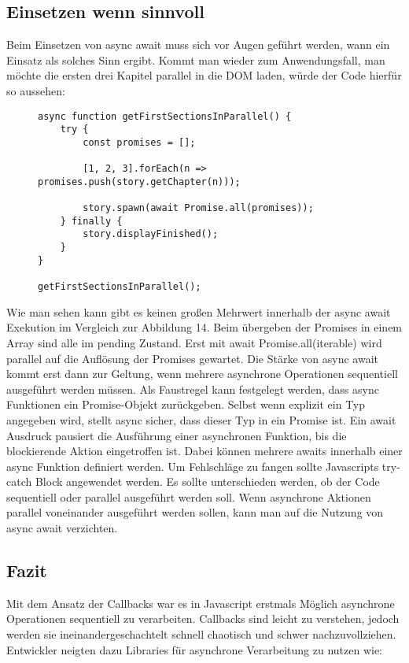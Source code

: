 \subsection{Einsetzen wenn sinnvoll}

Beim Einsetzen von async await muss sich vor Augen geführt werden, wann ein Einsatz als solches Sinn ergibt. Kommt man wieder zum Anwendungsfall, man möchte die ersten drei Kapitel parallel in die DOM laden, würde der Code hierfür so aussehen:

\begin{figure}[H]
\begin{lstlisting}[basicstyle=\small]
async function getFirstSectionsInParallel() {
    try {
        const promises = [];

        [1, 2, 3].forEach(n => promises.push(story.getChapter(n)));

        story.spawn(await Promise.all(promises));
    } finally {
        story.displayFinished();
    }
}

getFirstSectionsInParallel();
\end{lstlisting}
\end{figure}

\noindent
Wie man sehen kann gibt es keinen großen Mehrwert innerhalb der async await Exekution im Vergleich zur Abbildung 14. Beim übergeben der Promises in einem Array sind alle im pending Zustand. Erst mit await Promise.all(iterable) wird parallel auf die Auflösung der Promises gewartet. Die Stärke von async await kommt erst dann zur Geltung, wenn mehrere asynchrone Operationen sequentiell ausgeführt werden müssen. Als Faustregel kann festgelegt werden, dass async Funktionen ein Promise-Objekt zurückgeben. Selbst wenn explizit ein Typ angegeben wird, stellt async sicher, dass dieser Typ in ein Promise ist. Ein await Ausdruck pausiert die Ausführung einer asynchronen Funktion, bis die blockierende Aktion eingetroffen ist. Dabei können mehrere awaits innerhalb einer async Funktion definiert werden. Um Fehlschläge zu fangen sollte Javascripts try-catch Block angewendet werden. Es sollte unterschieden werden, ob der Code sequentiell oder parallel ausgeführt werden soll. Wenn asynchrone  Aktionen parallel voneinander ausgeführt werden sollen, kann man auf die Nutzung von async await verzichten.

\subsection{Fazit}

Mit dem Ansatz der Callbacks war es in Javascript erstmals Möglich asynchrone Operationen sequentiell zu verarbeiten. Callbacks sind leicht zu verstehen, jedoch werden sie ineinandergeschachtelt schnell chaotisch und schwer nachzuvollziehen. Entwickler neigten dazu Libraries für asynchrone Verarbeitung zu nutzen wie:

